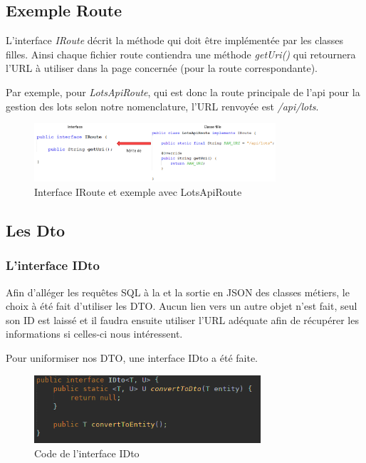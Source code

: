 		\subsection{Exemple Route}

			L'interface \textit{IRoute} décrit la méthode qui doit être implémentée par les classes filles.\newline
			Ainsi chaque fichier route contiendra une méthode \textit{getUri()} qui retournera l'URL à utiliser dans la page concernée (pour la route correspondante).

			\noindent
			Par exemple, pour \textit{LotsApiRoute}, qui est donc la route principale de l'api pour la gestion des lots selon notre nomenclature, l'URL renvoyée est \textit{/api/lots}.

			\begin{figure}[H]
				\centering\includegraphics[width=0.80\textwidth, keepaspectratio]{res/IRoute.png}
				\caption{Interface IRoute et exemple avec LotsApiRoute}
			\end{figure}

		\newpage
		\subsection{Les Dto}

			\subsubsection{L'interface IDto}

				Afin d'alléger les requêtes SQL à la \bdd{} et la sortie en JSON des classes métiers, le choix à été fait d'utiliser les DTO. Aucun lien vers un autre objet n'est fait, seul son ID est laissé et il faudra ensuite utiliser l'URL adéquate afin de récupérer les informations si celles-ci nous intéressent.

				\noindent
				Pour uniformiser nos DTO, une interface IDto a été faite.

				\begin{figure}[H]
					\centering\includegraphics[width=0.75\textwidth, keepaspectratio]{res/idto.png}
					\caption{Code de l'interface IDto}
				\end{figure}

